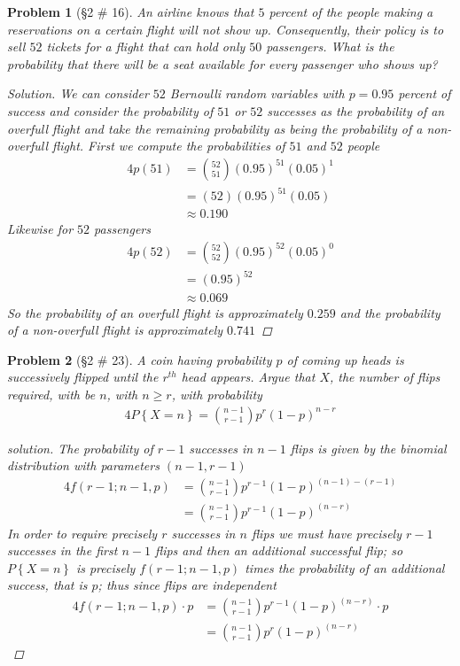 \documentclass[11pt, oneside]{book}   	%
\newtheorem{problem}{Problem}[chapter]
\newcommand{\set}[1]{\left\{#1\right\}}
\begin{document}
\begin{problem}[\S 2 \# 16]
	An airline knows that $5$ percent of the people making a reservations on a certain flight will not show up. Consequently, their policy is to sell $52$ tickets for a flight that can hold only $50$ passengers. What is the probability that there will be a seat available for every passenger who shows up? 
	\begin{proof}[Solution]
		We can consider $52$ Bernoulli random variables with $p=0.95$ percent of success and consider the probability of $51$ or $52$ successes as the probability of an overfull flight and take the remaining probability as being the probability of a non-overfull flight. First we compute the probabilities of $51$ and $52$ people
		\begin{alignat}{4}
			p(51)&=\binom{52}{51}(0.95)^51(0.05)^1 \\
				&=(52)(0.95)^51(0.05) \\
				&\approx 0.190
		\end{alignat}
		Likewise for $52$ passengers 
		\begin{alignat}{4}
			p(52)&=\binom{52}{52}(0.95)^52(0.05)^0 \\
				&=(0.95)^52 \\
				&\approx 0.069
		\end{alignat}
		So the probability of an overfull flight is approximately $0.259$ and the probability of a non-overfull flight is approximately $0.741$
	\end{proof}
\end{problem}

\begin{problem}[\S 2 \# 23]
	A coin having probability $p$ of coming up heads is successively flipped until the $r^{th}$ head appears. Argue that $X$, the number of flips required, with be $n$, with $n \geq r$, with probability 
	\begin{alignat}{4}
		P\set{X=n}=\binom{n-1}{r-1}p^r(1-p)^{n-r}
	\end{alignat}
	\begin{proof}[solution]
		The probability of $r-1$ successes in $n-1$ flips is given by the binomial distribution with parameters $(n-1, r-1)$ 
		\begin{alignat}{4}
			f(r-1; n-1, p)&=\binom{n-1}{r-1}p^{r-1}(1-p)^{(n-1)-(r-1)} \\
				&=\binom{n-1}{r-1}p^{r-1}(1-p)^{(n-r)}
		\end{alignat}
		In order to require precisely $r$ successes in $n$ flips we must have precisely $r-1$ successes in the first $n-1$ flips and then an additional successful flip; so $P\set{X=n}$ is precisely $f(r-1; n-1, p)$ times the probability of an additional success, that is $p$; thus since flips are independent
		\begin{alignat}{4}
			f(r-1; n-1, p)\cdot p&=\binom{n-1}{r-1}p^{r-1}(1-p)^{(n-r)} \cdot p \\
				&=\binom{n-1}{r-1}p^{r}(1-p)^{(n-r)}
		\end{alignat}
	\end{proof}
\end{problem}
\end{document}
